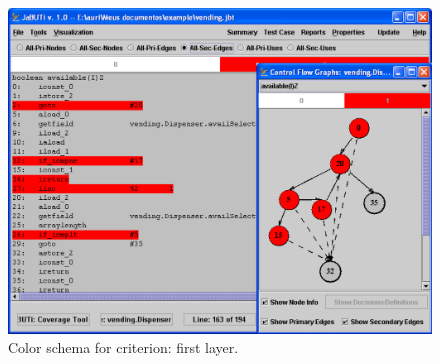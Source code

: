 \begin{figure}[!ht]
\begin{center}
\includegraphics[height=0.40\textheight]{fig/sec-edges-layer1.eps}
\caption{\label{fig:sec-edges-1} Color schema for
 criterion: first layer.}
\end{center}
\end{figure}
